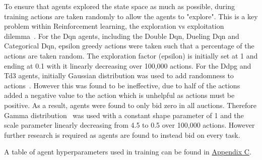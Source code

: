 To ensure that agents explored the state space as much as possible, during training actions are taken randomly to allow
the agents to "explore". This is a key problem within Reinforcement learning, the exploration vs exploitation
dilemma~\citep{Sutton1998}. For the Dqn agents, including the Double Dqn, Dueling Dqn and Categorical Dqn, epsilon
greedy actions were taken such that a percentage of the actions are taken random. The exploration factor (epsilon) is
initially set at 1 and ending at 0.1 with it linearly decreasing over 100,000 actions. For the Ddpg and Td3 agents,
initially Gaussian distribution was used to add randomness to actions~\citep{ddpg}. However this was found to be
ineffective, due to half of the actions added a negative value to the action which is unhelpful as actions must be
positive. As a result, agents were found to only bid zero in all auctions. Therefore Gamma
distribution~\citep{gamma-distribution} was used with a constant shape parameter of 1 and the scale parameter linearly
decreasing from 4.5 to 0.5 over 100,000 actions. However further research is required as agents are found to instead
bid on every task.

A table of agent hyperparameters used in training can be found in \hyperref[app:agent-hyperparameter]{Appendix C}.

